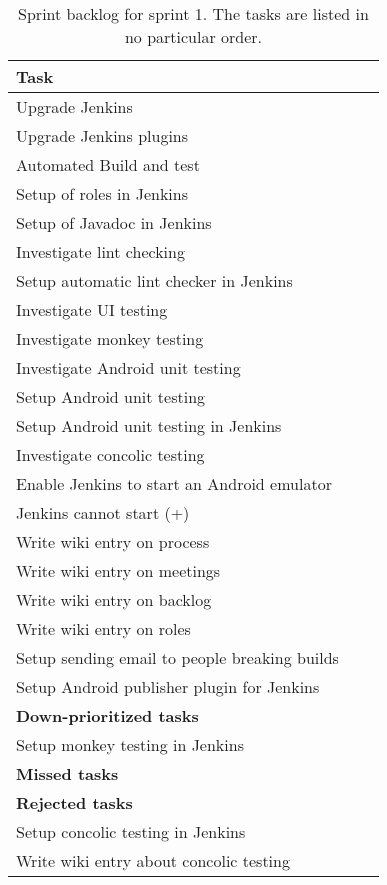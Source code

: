 \begin{table}%
  \centering
  \begin{tabular}{p{}rr}
    \toprule
    \textbf{Task} \\
    \midrule
    Upgrade Jenkins                                   \\
    Upgrade Jenkins plugins                           \\
    Automated Build and test                          \\
    Setup of roles in Jenkins                         \\
    Setup of Javadoc in Jenkins                       \\
    Investigate lint checking                         \\
    Setup automatic lint checker in Jenkins           \\
    Investigate UI testing                            \\
    Investigate monkey testing                        \\
    Investigate Android unit testing                  \\
    Setup Android unit testing                        \\
    Setup Android unit testing in Jenkins             \\
    Investigate concolic testing                      \\
    Enable Jenkins to start an Android emulator       \\
    Jenkins cannot start (+)                          \\
    Write wiki entry on process                       \\
    Write wiki entry on meetings                      \\
    Write wiki entry on backlog                       \\
    Write wiki entry on roles                         \\
    Setup sending email to people breaking builds     \\
    Setup Android publisher plugin for Jenkins        \\
    \midrule
    \textbf{Down-prioritized tasks} & & \\
    \midrule
    Setup monkey testing in Jenkins                   \\
    \midrule
    \textbf{Missed tasks} & & \\
    \midrule
    
    \midrule
    \textbf{Rejected tasks} & & \\
    \midrule
    Setup concolic testing in Jenkins                 \\
    Write wiki entry about concolic testing           \\
    \bottomrule
  \end{tabular}
\caption{Sprint backlog for sprint 1. The tasks are listed in no particular order.}
\label{tab:sprint1_tasks}
\end{table}

